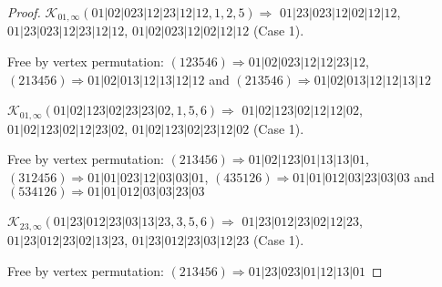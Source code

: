 \documentclass[12pt]{article}
\theoremstyle{plain}
\theoremstyle{definition}
\theoremstyle{remark}
\newcommand{\fancy}[1]{\mathcal{#1}}
\def\K{\fancy{K}}
\begin{document}
\begin{proof}
	
	\bigskip
	
	$\K_{01,\infty}(01|02|023|12|23|12|12,1, 2, 5)\Rightarrow $ $01|23|023|12|02|12|12$, $01|23|023|12|23|12|12$, $01|02|023|12|02|12|12$ (Case 1).
	
	
	
	Free by vertex permutation: $(1 2 3 5 4 6)\Rightarrow 01|02|023|12|12|23|12$, $(2 1 3 4 5 6)\Rightarrow 01|02|013|12|13|12|12$ and $(2 1 3 5 4 6)\Rightarrow 01|02|013|12|12|13|12$
	
	
	\bigskip
	
	$\K_{01,\infty}(01|02|123|02|23|23|02,1, 5, 6)\Rightarrow $ $01|02|123|02|12|12|02$, $01|02|123|02|12|23|02$, $01|02|123|02|23|12|02$ (Case 1).
	
	
	
	Free by vertex permutation: $(2 1 3 4 5 6)\Rightarrow 01|02|123|01|13|13|01$, $(3 1 2 4 5 6)\Rightarrow 01|01|023|12|03|03|01$, $(4 3 5 1 2 6)\Rightarrow 01|01|012|03|23|03|03$ and $(5 3 4 1 2 6)\Rightarrow 01|01|012|03|03|23|03$
	
	
	\bigskip
	
	$\K_{23,\infty}(01|23|012|23|03|13|23,3, 5, 6)\Rightarrow $ $01|23|012|23|02|12|23$, $01|23|012|23|02|13|23$, $01|23|012|23|03|12|23$ (Case 1).
	
	
	
	Free by vertex permutation: $(2 1 3 4 5 6)\Rightarrow 01|23|023|01|12|13|01$
	
	
	\bigskip
	

\end{proof}
\end{document}
